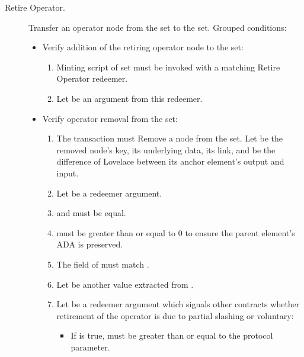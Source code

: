 \documentclass[../midgard.tex]{subfiles}
\begin{document}
\begin{description}
    \item[Retire Operator.] Transfer an operator node from the  set to the  set.
      Grouped conditions:
        \begin{itemize}
          \item Verify addition of the retiring operator node to the  set:
            \begin{enumerate}
              \item Minting script of  set must be invoked with a matching Retire Operator redeemer.
              \item Let  be an argument from this redeemer.
            \end{enumerate}
          \item Verify operator removal from the  set:
            \begin{enumerate}[resume]
              \item The transaction must Remove a node from the  set.
                Let  be the removed node's key,  its underlying data,  its link, and  be the difference of Lovelace between its anchor element's output and input.
              \item Let  be a redeemer argument.
              \item {} and  must be equal.
              \item {} must be greater than or equal to 0 to ensure the parent element's ADA is preserved.
              \item The  field of  must match .
              \item Let  be another value extracted from .
              \item Let  be a redeemer argument which signals other contracts whether retirement of the operator is due to partial slashing or voluntary:
                \begin{itemize}
                  \item If  is true,  must be greater than or equal to the  protocol parameter.

\end{itemize}
\end{enumerate}
\end{itemize}
\end{description}
\end{document}
